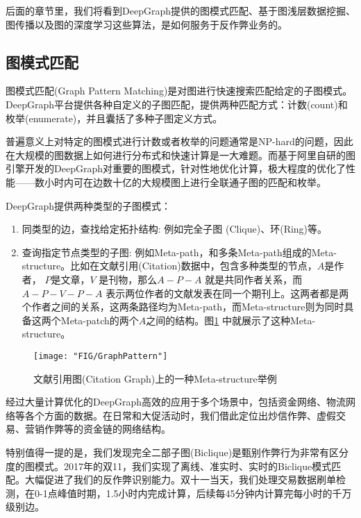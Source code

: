 后面的章节里，我们将看到DeepGraph提供的图模式匹配、基于图浅层数据挖掘、图传播以及图的深度学习这些算法，是如何服务于反作弊业务的。


\subsection{图模式匹配}

图模式匹配(Graph Pattern Matching)是对图进行快速搜索匹配给定的子图模式。DeepGraph平台提供各种自定义的子图匹配，提供两种匹配方式：计数(count)和枚举(enumerate)，并且囊括了多种子图定义方式。

普遍意义上对特定的图模式进行计数或者枚举的问题通常是NP-hard的问题，因此在大规模的图数据上如何进行分布式和快速计算是一大难题。而基于阿里自研的图引擎开发的DeepGraph对重要的图模式，针对性地优化计算，极大程度的优化了性能——数小时内可在边数十亿的大规模图上进行全联通子图的匹配和枚举。

DeepGraph提供两种类型的子图模式：
\begin{enumerate}
	\item 同类型的边，查找给定拓扑结构: 例如完全子图 (Clique)、环(Ring)等。
	\item 查询指定节点类型的子图: 例如Meta-path\cite{Pathsim}，和多条Meta-path组成的Meta-structure。比如在文献引用(Citation)数据中，包含多种类型的节点，$A$是作者，
	$P$是文章，$V$ 是刊物，那么$A-P-A$
	 就是共同作者关系，而$A-P-V-P-A$ 表示两位作者的文献发表在同一个期刊上。这两者都是两个作者之间的关系，这两条路径均为Meta-path，而Meta-structure则为同时具备这两个Meta-patch的两个$A$之间的结构。图\ref{fig:chap12_graph_pattern} 中就展示了这种Meta-structure。
\end{enumerate}

\begin{figure}[h]
	\centering
	\texttt{[image: "FIG/GraphPattern"]}
	\caption{文献引用图(Citation Graph)上的一种Meta-structure举例}
	\label{fig:chap12_graph_pattern}
\end{figure}

经过大量计算优化的DeepGraph高效的应用于多个场景中，包括资金网络、物流网络等各个方面的数据。在日常和大促活动时，我们借此定位出炒信作弊、虚假交易、营销作弊等的资金链的网络结构。

特别值得一提的是，我们发现完全二部子图(Biclique)是甄别作弊行为非常有区分度的图模式。2017年的双11，我们实现了离线、准实时、实时的Biclique模式匹配。大幅促进了我们的反作弊识别能力。双十一当天，我们处理交易数据刷单检测，在0-1点峰值时期，1.5小时内完成计算，后续每45分钟内计算完每小时的千万级别边。


